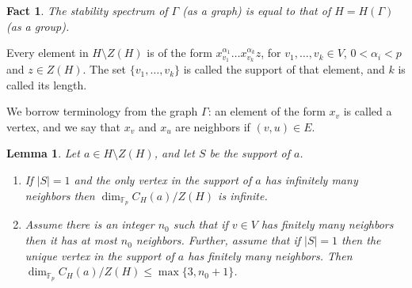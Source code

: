 \documentclass[11pt]{amsart}
\theoremstyle{plain}
\newtheorem{lemma}[theorem]{Lemma}
\newtheorem{fact}[theorem]{Fact}
\theoremstyle{definition}
\theoremstyle{remark}
\numberwithin{equation}{section}
\begin{document}
\begin{fact}\label{F: stability}\cite[Theorem 2.12]{Mek:stability}
    The stability spectrum of $\Gamma$ (as a graph) is equal to that of $H=H(\Gamma)$ (as a group).
\end{fact}

Every element in $H\setminus Z(H)$ is of the form $x_{v_1}^{\alpha_1}\dots x_{v_k}^{\alpha_k}z$, for $v_1,\dots,v_k\in V$, $0<\alpha_i<p$ and $z\in Z(H)$. The set $\{v_1,\dots,v_k\}$ is called the support of that element, and $k$ is called its length.

We borrow terminology from the graph $\Gamma$: an element of the form $x_v$ is called a vertex, and we say that $x_v$ and $x_u$ are neighbors if $(v,u)\in E$.

\begin{lemma}\label{L: dim computations}
    Let $a\in H\setminus Z(H)$, and let $S$ be the support of $a$.
    \begin{enumerate}
        \item If $|S|=1$ and the only vertex in the support of $a$ has infinitely many neighbors then $\dim_{\mathbb{F}_p}C_H(a)/Z(H)$ is infinite.
        \item Assume there is an integer $n_0$ such that if $v\in V$ has finitely many neighbors then it has at most $n_0$ neighbors. Further, assume that if $|S|=1$ then the unique vertex in the support of $a$ has finitely many neighbors. Then $\dim_{\mathbb{F}_p}C_H(a)/Z(H)\leq \max\{3,n_0+1\}$.
    \end{enumerate}
\end{lemma}
\end{document}
